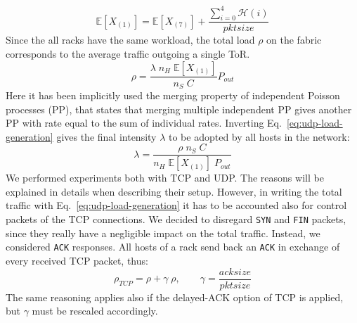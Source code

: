 \[
\mathbb{E}[X_{(1)}] = \mathbb{E}[X_{(7)}] + \dfrac{\sum_{i=0}^{4}\mathcal{H}(i)}{pktsize}
\]
Since the all racks have the same workload, the total load $\rho$ on the fabric corresponds to the average traffic outgoing a single ToR.
\begin{equation}
	\label{eq:udp-load-generation}
	\rho = \dfrac{\lambda \; n_H \; \mathbb{E}[X_{(1)}]}{n_S \; C} P_{out}
\end{equation} 
Here it has been implicitly used the merging property of independent Poisson processes (PP), that states that merging multiple independent PP gives another PP with rate equal to the sum of individual rates. Inverting Eq.~\eqref{eq:udp-load-generation} gives the final intensity $\lambda$ to be adopted by all hosts in the network: 
\begin{equation}
	\label{eq:lambda}
	\lambda = \frac{\rho \; n_S \; C}{n_H \; \mathbb{E}[X_{(1)}] \; P_{out}}
\end{equation}
We performed experiments both with TCP and UDP. The reasons will be explained in details when describing their setup. However, in writing the total traffic with Eq.~\eqref{eq:udp-load-generation} it has to be accounted also for control packets of the TCP connections. We decided to disregard \texttt{SYN} and \texttt{FIN} packets, since they really have a negligible impact on the total traffic.  Instead, we considered \texttt{ACK} responses. All hosts of a rack send back an \texttt{ACK} in exchange of every received TCP packet, thus:
\begin{equation}
	\rho_{TCP} = \rho + \gamma \; \rho, \qquad \gamma = \dfrac{acksize}{pktsize}
\end{equation}
The same reasoning applies also if the delayed-ACK option of TCP is applied, but $\gamma$ must be rescaled accordingly.  \\
